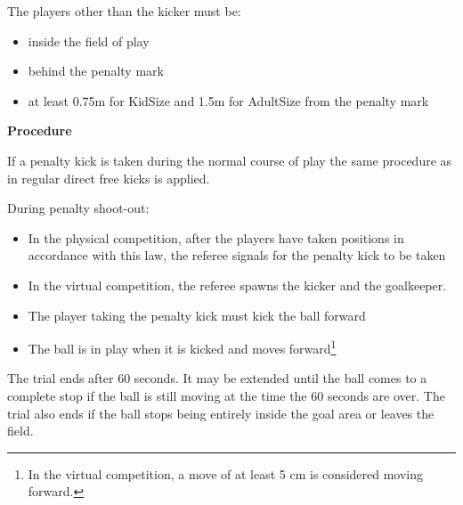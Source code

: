 The players other than the kicker must be:

\begin{itemize}
\item inside the field of play
\item behind the penalty mark
\item at least 0.75m for KidSize and 1.5m for AdultSize from the
      penalty mark 
\end{itemize}

\bigskip

{\bfseries Procedure}

\headlinebox

If a penalty kick is taken during the normal course of play the same procedure
as in regular direct free kicks is applied.

\bigskip
During penalty shoot-out:

\begin{itemize}
\item In the physical competition, after the players have taken positions in accordance with this law,
    the referee signals for the penalty kick to be taken
\item In the virtual competition, the referee spawns the kicker and the goalkeeper.
\item The player taking the penalty kick must kick the ball forward
\item The ball is in play when it is kicked and moves forward\footnote{In the virtual competition, a move of at least 5 cm is considered moving forward.}
\end{itemize}


\bigskip

The trial ends after 60 seconds.
It may be extended until the ball comes to a complete stop if the ball is still
moving at the time the 60 seconds are over.
The trial also ends if the ball stops being entirely inside the goal area or
leaves the field.

